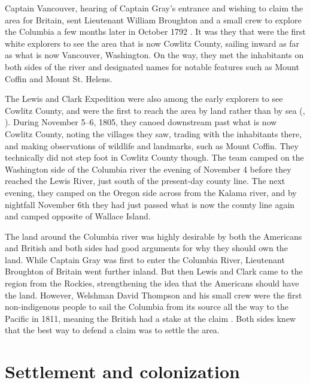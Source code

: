 Captain Vancouver, hearing of Captain Gray's entrance and wishing to claim the area for Britain, sent Lieutenant William Broughton and a small crew to explore the Columbia a few months later in October 1792 \citep[16-17]{urrutia_1998}. It was they that were the first white explorers to see the area that is now Cowlitz County, sailing inward as far as what is now Vancouver, Washington. On the way, they met the inhabitants on both sides of the river and designated names for notable features such as Mount Coffin  and Mount St. Helens.

The Lewis and Clark Expedition were also among the early explorers to see Cowlitz County, and were the first to reach the area by land rather than by sea (\citealt[20--23]{urrutia_1998}, \citealt[3--4]{olson_1948}). During November 5--6, 1805, they canoed downstream past what is now Cowlitz County, noting the villages they saw, trading with the inhabitants there, and making observations of wildlife and landmarks, such as Mount Coffin. They technically did not step foot in Cowlitz County though. The team camped on the Washington side of the Columbia river the evening of November 4 before they reached the Lewis River, just south of the present-day county line. The next evening, they camped on the Oregon side across from the Kalama river, and by nightfall November 6th they had just passed what is now the county line again and camped opposite of Wallace Island.

The land around the Columbia river was highly desirable by both the Americans and British and both sides had good arguments for why they should own the land. While Captain Gray was first to enter the Columbia River, Lieutenant Broughton of Britain went further inland. But then Lewis and Clark came to the region from the Rockies, strengthening the idea that the Americans should have the land. However, Welshman David Thompson and his small crew were the first non-indigenous people to sail the Columbia from its source all the way to the Pacific in 1811, meaning the British had a stake at the claim \citep[26]{urrutia_1998}. Both sides knew that the best way to defend a claim was to settle the area.

\section{Settlement and colonization}
\label{sec:settlement_colonization}

